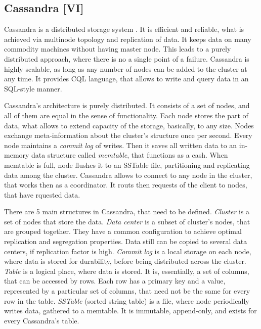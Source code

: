\subsection{Cassandra [VI]}

Cassandra is a distributed storage system \cite{Cassandra, Avinash2014, Hewitt2011}.
It is efficient and reliable, what is achieved via multinode topology and replication of data.
It keeps data on many commodity machines without having master node.
This leads to a purely distributed approach, where there is no a single point of a failure.
Cassandra is highly scalable, as long as any number of nodes can be added to the cluster at any time.
It provides CQL language, that allows to write and query data in an SQL-style manner.

Cassandra's architecture is purely distributed.
It consists of a set of nodes, and all of them are equal in the sense of functionality.
Each node stores the part of data, what allows to extend capacity of the storage, basically, to any size.
Nodes exchange meta-information about the cluster's structure once per second.
Every node maintains a \textit{commit log} of writes.
Then it saves all written data to an in-memory data structure called \textit{memtable}, that functions as a cash.
When memtable is full, node flushes it to an SSTable file, partitioning and replicating data among the cluster.
Cassandra allows to connect to any node in the cluster, that works then as a coordinator.
It routs then requests of the client to nodes, that have rquested data.

There are 5 main structures in Cassandra, that need to be defined.
\textit{Cluster} is a set of nodes that store the data.
\textit{Data center} is a subset of cluster's nodes, that are grouped together.
They have a common configuration to achieve optimal replication and segregation properties.
Data still can be copied to several data centers, if replication factor is high.
\textit{Commit log} is a local storage on each node, where data is stored for durability, before being distributed across the cluster.
\textit{Table} is a logical place, where data is stored.
It is, essentially, a set of columns, that can be accessed by rows.
Each row has a primary key and a value, represented by a particular set of columns, that need not be the same for every row in the table.
\textit{SSTable} (sorted string table) is a file, where node periodically writes data, gathered to a memtable.
It is immutable, append-only, and exists for every Cassandra's table.

